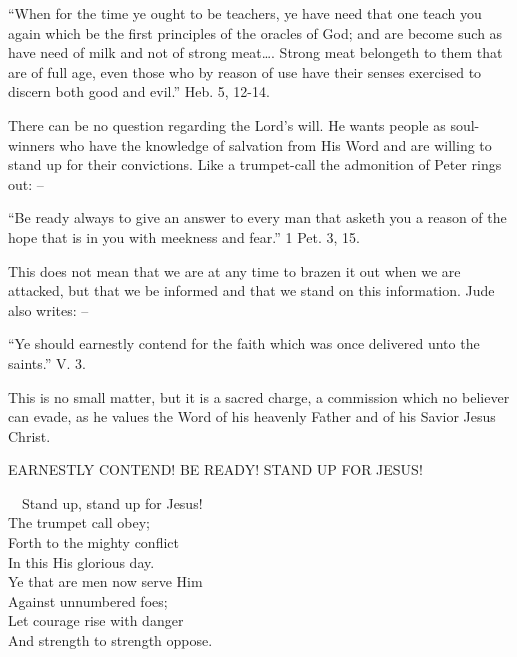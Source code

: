 \documentclass[
]{book}
\begin{document}
``When for the time ye ought to be teachers, ye have need that one teach you again which be the first principles of the oracles of God; and are become such as have need of milk and not of strong meat\ldots. Strong meat belongeth to them that are of full age, even those who by reason of use have their senses exercised to discern both good and evil.'' Heb. 5, 12-14.

There can be no question regarding the Lord's will. He wants people as soul-winners who have the knowledge of salvation from His Word and are willing to stand up for their convictions. Like a trumpet-call the admonition of Peter rings out: --

``Be ready always to give an answer to every man that asketh you a reason of the hope that is in you with meekness and fear.'' 1 Pet. 3, 15.

This does not mean that we are at any time to brazen it out when we are attacked, but that we be informed and that we stand on this information. Jude also writes: --

``Ye should earnestly contend for the faith which was once delivered unto the saints.'' V. 3.

This is no small matter, but it is a sacred charge, a commission which no believer can evade, as he values the Word of his heavenly Father and of his Savior Jesus Christ.

\begin{center} EARNESTLY CONTEND!  BE READY!  STAND UP FOR JESUS! \end{center}

~~Stand up, stand up for Jesus!\\
\hspace*{0.333em}\hspace*{0.333em}The trumpet call obey;\\
\hspace*{0.333em}\hspace*{0.333em}Forth to the mighty conflict\\
\hspace*{0.333em}\hspace*{0.333em}In this His glorious day.\\
\hspace*{0.333em}\hspace*{0.333em}Ye that are men now serve Him\\
\hspace*{0.333em}\hspace*{0.333em}Against unnumbered foes;\\
\hspace*{0.333em}\hspace*{0.333em}Let courage rise with danger\\
\hspace*{0.333em}\hspace*{0.333em}And strength to strength oppose.
\end{document}
